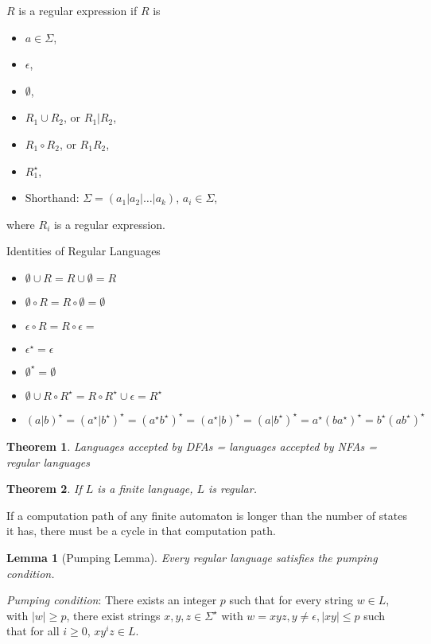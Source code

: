 \documentclass[letterpaper,landscape,11pt]{article}
\newtheorem{theorem}{Theorem}
\newtheorem{lemma}{Lemma}
\begin{document}
$R$ is a regular expression if $R$ is
\begin{itemize}
	\item $a \in \Sigma$,
	\item $\epsilon$,
	\item $\emptyset$,
	\item $R_1 \cup R_2$, or $R_1 | R_2$,
	\item $R_1 \circ R_2$, or $R_1R_2$,
	\item $R_1^\star$,
	\item Shorthand: $\Sigma = (a_1 | a_2 | \dots | a_k)$, $a_i \in \Sigma$,
\end{itemize}
where $R_i$ is a regular expression.

Identities of Regular Languages
\begin{itemize}
	\item $\emptyset \cup R = R \cup \emptyset = R$
	\item $\emptyset \circ R = R \circ \emptyset = \emptyset$
	\item $\epsilon \circ R = R \circ \epsilon = $
	\item $\epsilon^\star = \epsilon$
	\item $\emptyset^\star = \emptyset$
	\item $\emptyset \cup R \circ R^\star = R \circ R^\star \cup \epsilon = R^\star$
	\item $(a | b)^\star = (a^\star | b^\star)^\star = (a^\star b^\star)^\star = (a^\star | b)^\star = (a | b^\star)^\star = a^\star(ba^\star)^\star = b^\star(ab^\star)^\star$
\end{itemize}

\begin{theorem}
	Languages accepted by DFAs = languages accepted by NFAs = regular languages
\end{theorem}

\begin{theorem}
	If $L$ is a finite language, $L$ is regular.
\end{theorem}

If a computation path of any finite automaton is longer than the number of states it has, there must be a cycle in that computation path.

\begin{lemma}[Pumping Lemma]
	Every regular language satisfies the pumping condition.
\end{lemma}

\emph{Pumping condition}: There exists an integer $p$ such that for every string $w \in L$, with $|w| \geq p$, there exist strings $x, y, z \in \Sigma^\star$ with $w = xyz, y \neq \epsilon, |xy| \leq p$ such that for all $i \geq 0$, $xy^iz \in L$.
\end{document}
